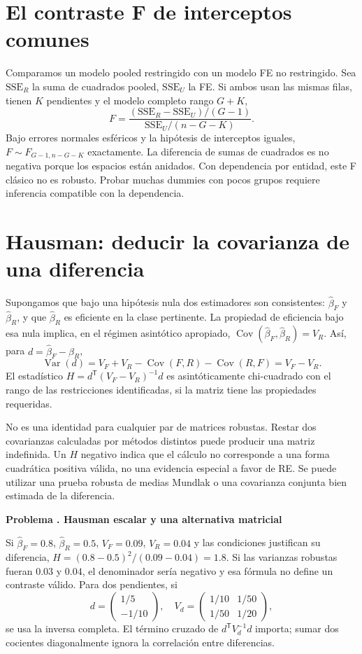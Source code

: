 \documentclass[11pt,a4paper]{article}
\newcommand{\T}{^{\mathsf T}}
\DeclareMathOperator{\Var}{Var}
\DeclareMathOperator{\Cov}{Cov}
\theoremstyle{definition}
\newcounter{problema}
\newenvironment{resuelto}[1]{\refstepcounter{problema}\par\medskip\Needspace{6\baselineskip}\textbf{Problema \theproblema. #1}\par}{\par\medskip}
\begin{document}
\section{El contraste F de interceptos comunes}
Comparamos un modelo pooled restringido con un modelo FE no restringido.
Sea $\mathrm{SSE}_R$ la suma de cuadrados pooled, $\mathrm{SSE}_U$ la FE.
Si ambos usan las mismas filas, tienen $K$ pendientes y el modelo completo rango $G+K$,
\[
F=\frac{(\mathrm{SSE}_R-\mathrm{SSE}_U)/(G-1)}
{\mathrm{SSE}_U/(n-G-K)}.
\]
Bajo errores normales esféricos y la hipótesis de interceptos iguales,
$F\sim F_{G-1,n-G-K}$ exactamente.
La diferencia de sumas de cuadrados es no negativa porque los espacios están anidados.
Con dependencia por entidad, este F clásico no es robusto. Probar muchas dummies con pocos grupos requiere inferencia compatible con la dependencia.

\section{Hausman: deducir la covarianza de una diferencia}
Supongamos que bajo una hipótesis nula dos estimadores son consistentes:
$\widehat\beta_F$ y $\widehat\beta_R$, y que $\widehat\beta_R$ es eficiente en la clase pertinente.
La propiedad de eficiencia bajo esa nula implica, en el régimen asintótico apropiado,
$\Cov(\widehat\beta_F,\widehat\beta_R)=V_R$.
Así, para $d=\widehat\beta_F-\widehat\beta_R$,
\[
\Var(d)=V_F+V_R-\Cov(F,R)-\Cov(R,F)=V_F-V_R.
\]
El estadístico $H=d\T(V_F-V_R)^{-1}d$ es asintóticamente chi-cuadrado con el rango de las restricciones identificadas, si la matriz tiene las propiedades requeridas.

No es una identidad para cualquier par de matrices robustas. Restar dos covarianzas calculadas por métodos distintos puede producir una matriz indefinida. Un $H$ negativo indica que el cálculo no corresponde a una forma cuadrática positiva válida, no una evidencia especial a favor de RE. Se puede utilizar una prueba robusta de medias Mundlak o una covarianza conjunta bien estimada de la diferencia.

\begin{resuelto}{Hausman escalar y una alternativa matricial}
Si $\widehat\beta_F=0.8$, $\widehat\beta_R=0.5$, $V_F=0.09$, $V_R=0.04$ y las condiciones justifican su diferencia,
$H=(0.8-0.5)^2/(0.09-0.04)=1.8$.
Si las varianzas robustas fueran $0.03$ y $0.04$, el denominador sería negativo y esa fórmula no define un contraste válido.
Para dos pendientes, si
\[
d=\begin{pmatrix}1/5\\-1/10\end{pmatrix},
\quad
V_d=\begin{pmatrix}1/10&1/50\\1/50&1/20\end{pmatrix},
\]
se usa la inversa completa. El término cruzado de $d\T V_d^{-1}d$ importa; sumar dos cocientes diagonalmente ignora la correlación entre diferencias.
\end{resuelto}
\end{document}
